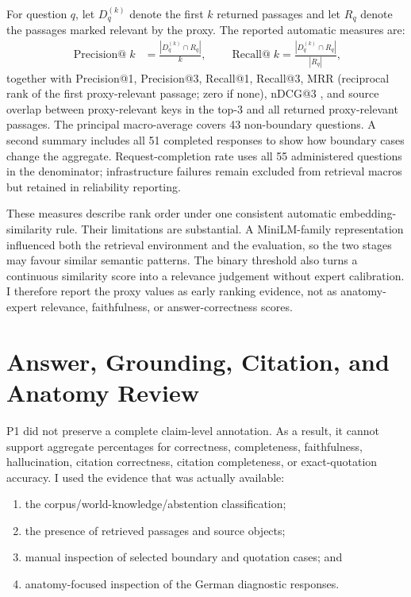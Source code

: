 For question $q$, let $D_q^{(k)}$ denote the first $k$ returned passages and let $R_q$ denote the passages marked relevant by the proxy. The reported automatic measures are:
\begin{align*}
\operatorname{Precision@}k&=\frac{|D_q^{(k)}\cap R_q|}{k},
\qquad
\operatorname{Recall@}k=\frac{|D_q^{(k)}\cap R_q|}{|R_q|},
\end{align*}
together with Precision@1, Precision@3, Recall@1, Recall@3, MRR (reciprocal rank of the first proxy-relevant passage; zero if none), nDCG@3 \parencite{jarvelin2002}, and source overlap between proxy-relevant keys in the top-3 and all returned proxy-relevant passages. The principal macro-average covers 43 non-boundary questions. A second summary includes all 51 completed responses to show how boundary cases change the aggregate. Request-completion rate uses all 55 administered questions in the denominator; infrastructure failures remain excluded from retrieval macros but retained in reliability reporting.

These measures describe rank order under one consistent automatic embedding-similarity rule. Their limitations are substantial. A MiniLM-family representation influenced both the retrieval environment and the evaluation, so the two stages may favour similar semantic patterns. The binary threshold also turns a continuous similarity score into a relevance judgement without expert calibration. I therefore report the proxy values as early ranking evidence, not as anatomy-expert relevance, faithfulness, or answer-correctness scores.

\section{Answer, Grounding, Citation, and Anatomy Review}
\label{sec:answer-review-method}

P1 did not preserve a complete claim-level annotation. As a result, it cannot support aggregate percentages for correctness, completeness, faithfulness, hallucination, citation correctness, citation completeness, or exact-quotation accuracy. I used the evidence that was actually available:

\begin{enumerate}
  \item the corpus/world-knowledge/abstention classification;
  \item the presence of retrieved passages and source objects;
  \item manual inspection of selected boundary and quotation cases; and
  \item anatomy-focused inspection of the German diagnostic responses.
\end{enumerate}

